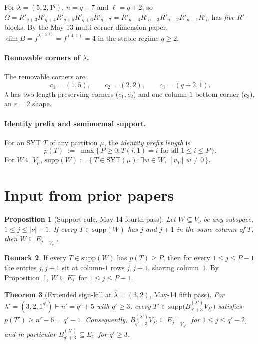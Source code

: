 \documentclass[11pt]{article}
\newtheorem{theorem}{Theorem}
\newtheorem{proposition}[theorem]{Proposition}
\theoremstyle{definition}
\newtheorem{remark}[theorem]{Remark}
\newcommand{\Om}{\Omega}
\newcommand{\hatl}{\widehat\lambda}
\newcommand{\supp}{\mathrm{supp}}
\newcommand{\SYT}{\mathrm{SYT}}
\newcommand{\Rp}{{R'}}
\begin{document}
For $\lambda = (5, 2, 1^q)$, $n = q + 7$ and $\ell = q + 2$, so
$\Om = \Rp_{q+3}\Rp_{q+4}\Rp_{q+5}\Rp_{q+6}\Rp_{q+7} =
\Rp_{n-4}\Rp_{n-3}\Rp_{n-2}\Rp_{n-1}\Rp_n$
has \emph{five} $\Rp$-blocks.  By the May-13 multi-corner-dimension
paper, $\dim B = f^{\lambda^{(\ge 2)}} = f^{(4, 1)} = 4$ in the stable
regime $q \ge 2$.

\paragraph{Removable corners of $\lambda$.}
The removable corners are
\[
   c_1 = (1, 5), \qquad c_2 = (2, 2), \qquad c_3 = (q+2, 1).
\]
$\lambda$ has two length-preserving corners ($c_1, c_2$) and one
column-$1$ bottom corner ($c_3$), an $r = 2$ shape.

\paragraph{Identity prefix and seminormal support.}  For an SYT $T$
of any partition $\mu$, the \emph{identity prefix length} is
\[
   p(T) \;:=\; \max\{\,P \ge 0 : T(i, 1) = i \text{ for all }
   1 \le i \le P\,\}.
\]
For $W \subseteq V_\mu$,
$\supp(W) := \{\,T \in \SYT(\mu) : \exists w \in W,\ [v_T]\,w \ne 0\,\}$.

\section{Input from prior papers}\label{sec:input}

\begin{proposition}[Support rule, May-14 fourth pass]\label{prop:support-rule}
Let $W \subseteq V_\nu$ be any subspace, $1 \le j \le |\nu|-1$.
If every $T \in \supp(W)$ has $j$ and $j+1$ in the same column of $T$,
then $W \subseteq E_j^-\!\mid_{V_\nu}$.
\end{proposition}

\begin{remark}\label{rem:prefix-implies-Ej-}
If every $T \in \supp(W)$ has $p(T) \ge P$, then for every
$1 \le j \le P - 1$ the entries $j, j+1$ sit at column-$1$ rows
$j, j+1$, sharing column~$1$.  By Proposition~\ref{prop:support-rule},
$W \subseteq E_j^-$ for $1 \le j \le P - 1$.
\end{remark}

\begin{theorem}[Extended sign-kill at $\hatl = (3, 2)$, May-14 fifth pass]\label{thm:32-prefix}
For $\lambda' = (3, 2, 1^{q'}) \vdash n' = q' + 5$ with $q' \ge 3$,
every $T' \in \supp\bigl(B^{(\lambda')}_{q'+3} V_{\lambda'}\bigr)$
satisfies $p(T') \ge n' - 6 = q' - 1$.  Consequently,
$B^{(\lambda')}_{q'+3} V_{\lambda'} \subseteq E_j^-\!\mid_{V_{\lambda'}}$
for $1 \le j \le q' - 2$, and in particular $B^{(\lambda')}_{q'+3} \subseteq E_1^-$
for $q' \ge 3$.
\end{theorem}
\end{document}
